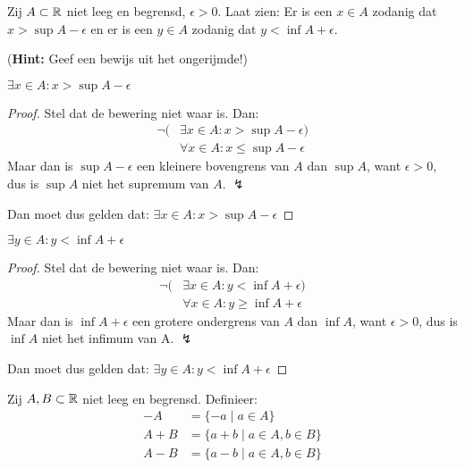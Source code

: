 \documentclass[week=1]{homework}
\begin{document}
\begin{questions}
        \question
        Zij $A \subset \mathbb{R}$ niet leeg en begrensd, $\epsilon > 0$. Laat zien: Er is een $x \in A$ zodanig dat $x > \sup A - \epsilon$ en er is een $y \in A$ zodanig dat $y < \inf A + \epsilon$.
        
        (\textbf{Hint:} Geef een bewijs uit het ongerijmde!)
        
        \begin{toprove}
        	$\exists x \in A: x > \sup A - \epsilon$
        \end{toprove}
               
        \begin{proof}
        	Stel dat de bewering niet waar is. Dan:
        	\begin{align*}
        	\neg(&\exists x \in A: x > \sup A - \epsilon) \\
        	&\forall x \in A: x \le \sup A - \epsilon 
        	\end{align*}
        	Maar dan is $\sup A - \epsilon$ een kleinere bovengrens van $A$ dan $\sup A$, want $\epsilon > 0$, dus is $\sup A$ niet het supremum van $A$. $\lightning$
        	
        	Dan moet dus gelden dat: $\exists x \in A: x > \sup A - \epsilon$
        \end{proof}        
        
        \begin{toprove}
        	$\exists y \in A: y < \inf A + \epsilon$
        \end{toprove} 
        
        \begin{proof}
        	Stel dat de bewering niet waar is. Dan: 
        	\begin{align*}
        	\neg(&\exists x \in A: y < \inf A + \epsilon) \\
        	&\forall x \in A: y \ge \inf A + \epsilon
        	\end{align*}
        	Maar dan is $\inf A + \epsilon$ een grotere ondergrens van $A$ dan $\inf A$, want $\epsilon > 0$, dus is $\inf A$ niet het infimum van A. $\lightning$
        	
        	Dan moet dus gelden dat: $\exists y \in A: y < \inf A + \epsilon$
        \end{proof}
        
        \question
        
        Zij $A,B \subset \mathbb{R}$ niet leeg en begrensd. Definieer:
        \begin{align*}
	        -A &= \{-a \mid a \in A\} \\
		    A + B &= \{a + b \mid a \in A, b \in B\} \\
			A - B &= \{a - b \mid a \in A, b \in B\}
        \end{align*}
        

\end{questions}
\end{document}
